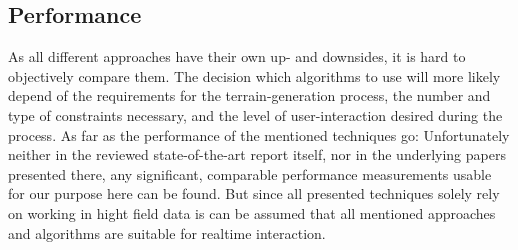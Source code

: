 \subsection{Performance}
As all different approaches have their own up- and downsides, it is hard to objectively compare them. The decision which algorithms to use will more likely depend of the requirements for the terrain-generation process, the number and type of constraints necessary, and the level of user-interaction desired during the process. As far as the performance of the mentioned techniques go: Unfortunately neither in the reviewed state-of-the-art report itself, nor in the underlying papers presented there, any significant, comparable performance measurements usable for our purpose here can be found. But since all presented techniques solely rely on working in hight field data is can be assumed that all mentioned approaches and algorithms are suitable for realtime interaction.